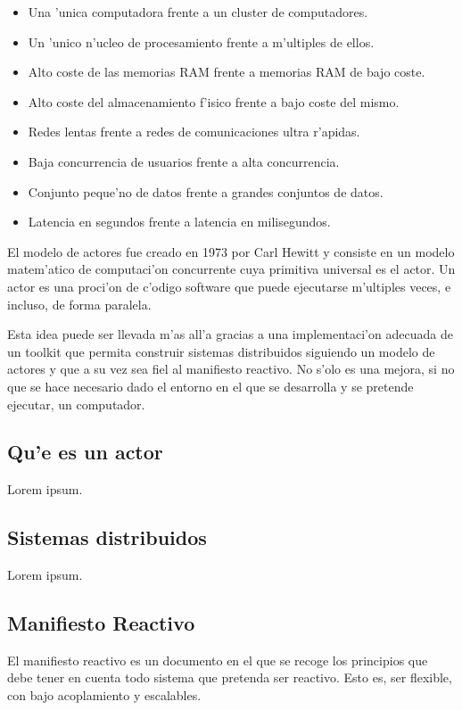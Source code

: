 \documentclass[12pt]{article}
\begin{document}
\begin{itemize}
	\item Una 'unica computadora frente a un cluster de computadores.
	\item Un 'unico n'ucleo de procesamiento frente a m'ultiples de ellos.
	\item Alto coste de las memorias RAM frente a memorias RAM de bajo coste.
	\item Alto coste del almacenamiento f'isico frente a bajo coste del mismo.
    \item Redes lentas frente a redes de comunicaciones ultra r'apidas.
    \item Baja concurrencia de usuarios frente a alta concurrencia.
    \item Conjunto peque'no de datos frente a grandes conjuntos de datos.
    \item Latencia en segundos frente a latencia en milisegundos.
\end{itemize}

El modelo de actores fue creado en 1973 por Carl Hewitt y consiste en un modelo
matem'atico de computaci'on concurrente cuya primitiva universal es el actor. Un actor es
una proci'on de c'odigo software que puede ejecutarse m'ultiples veces, e incluso,
de forma paralela.

Esta idea puede ser llevada m'as all'a gracias a una implementaci'on adecuada de un toolkit
que permita construir sistemas distribuidos siguiendo un modelo de actores y que a su vez
sea fiel al manifiesto reactivo. No s'olo es una mejora, si no que se hace necesario dado
el entorno en el que se desarrolla y se pretende ejecutar, un computador.
\subsection{Qu'e es un actor}
\label{sub:que es un actor}
Lorem ipsum.
\subsection{Sistemas distribuidos}
\label{sub:sistemas distribuidos}
Lorem ipsum.
\subsection{Manifiesto Reactivo}
\label{sub:manifiesto reactivo}
El manifiesto reactivo es un documento en el que se recoge los principios que debe
tener en cuenta todo sistema que pretenda ser reactivo. Esto es, ser flexible, con bajo
acoplamiento y escalables.
\end{document}
